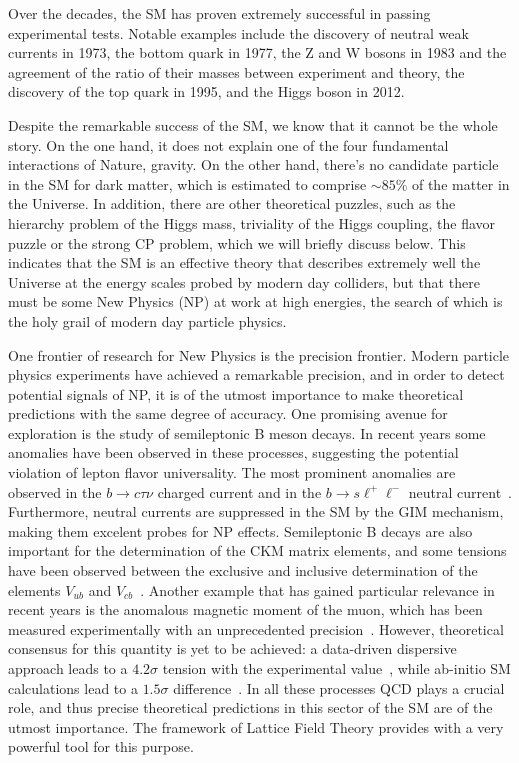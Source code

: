 Over the decades, the SM has proven extremely successful in passing experimental tests. Notable examples include the discovery of neutral weak currents in 1973, the bottom quark in 1977, the Z and W bosons in 1983 and the agreement of the ratio of their masses between experiment and theory, the discovery of the top quark in 1995, and the Higgs boson in 2012. 

Despite the remarkable success of the SM, we know that it cannot be the whole story. On the one hand, it does not explain one of the four fundamental interactions of Nature, gravity. On the other hand, there's no candidate particle in the SM for dark matter, which is estimated to comprise $\sim85\%$ of the matter in the Universe. In addition, there are other theoretical puzzles, such as the hierarchy problem of the Higgs mass, triviality of the Higgs coupling, the flavor puzzle or the strong CP problem, which we will briefly discuss below. This indicates that the SM is an effective theory that describes extremely well the Universe at the energy scales probed by modern day colliders, but that there must be some New Physics (NP) at work at high energies, the search of which is the holy grail of modern day particle physics. 

One frontier of research for New Physics is the precision frontier. Modern particle physics experiments have achieved a remarkable precision, and in order to detect potential signals of NP, it is of the utmost importance to make theoretical predictions with the same degree of accuracy. One promising avenue for exploration is the study of semileptonic B meson decays. In recent years some anomalies have been observed in these processes, suggesting the potential violation of lepton flavor universality. The most prominent anomalies are observed in the $b\to c\tau\nu$ charged current and in the $b\to s\ell^+\ell^-$ neutral current~\citep{Capdevila:2023yhq}. Furthermore, neutral currents are suppressed in the SM by the GIM mechanism, making them excelent probes for NP effects. Semileptonic B decays are also important for the determination of the CKM matrix elements, and some tensions have been observed between the exclusive and inclusive determination of the elements $V_{ub}$ and $V_{cb}$~\citep{Ricciardi:2019zph}. Another example that has gained particular relevance in recent years is the anomalous magnetic moment of the muon, which has been measured experimentally with an unprecedented precision~\citep{Muong-2:2006rrc}. However, theoretical consensus for this quantity is yet to be achieved: a data-driven dispersive approach leads to a $4.2\sigma$ tension with the experimental value~\citep{Aoyama:2020ynm}, while ab-initio SM calculations lead to a $1.5\sigma$ difference~\citep{Borsanyi:2020mff}. In all these processes QCD plays a crucial role, and thus precise theoretical predictions in this sector of the SM are of the utmost importance. The framework of Lattice Field Theory provides with a very powerful tool for this purpose.

